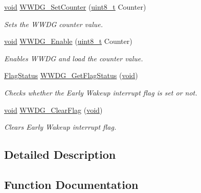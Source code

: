 \begin{DoxyCompactItemize}
\hyperlink{usb__devapi_8h_afabf60e7f57651d6d595a02c75f07cd0}{void} \hyperlink{group___w_w_d_g___private___functions_ga6e44cc35f133b28b9ad861f459bf8d76}{W\+W\+D\+G\+\_\+\+Set\+Counter} (\hyperlink{_p_e___types_8h_aba7bc1797add20fe3efdf37ced1182c5}{uint8\+\_\+t} Counter)
\begin{DoxyCompactList}\small\item\em Sets the W\+W\+DG counter value. \end{DoxyCompactList}\item 
\hyperlink{usb__devapi_8h_afabf60e7f57651d6d595a02c75f07cd0}{void} \hyperlink{group___w_w_d_g___private___functions_ga10dc2554d0b504b5472e3ecf0f02a9e6}{W\+W\+D\+G\+\_\+\+Enable} (\hyperlink{_p_e___types_8h_aba7bc1797add20fe3efdf37ced1182c5}{uint8\+\_\+t} Counter)
\begin{DoxyCompactList}\small\item\em Enables W\+W\+DG and load the counter value. \end{DoxyCompactList}\item 
\hyperlink{agilefox_2library_2inc_2stm32f10x__type_8h_a89136caac2e14c55151f527ac02daaff}{Flag\+Status} \hyperlink{group___w_w_d_g___private___functions_ga7df4882d45918b9b8249dfca1e44fabc}{W\+W\+D\+G\+\_\+\+Get\+Flag\+Status} (\hyperlink{usb__devapi_8h_afabf60e7f57651d6d595a02c75f07cd0}{void})
\begin{DoxyCompactList}\small\item\em Checks whether the Early Wakeup interrupt flag is set or not. \end{DoxyCompactList}\item 
\hyperlink{usb__devapi_8h_afabf60e7f57651d6d595a02c75f07cd0}{void} \hyperlink{group___w_w_d_g___private___functions_gabd2b5a6317c2e1a3ab0795838ce59dd2}{W\+W\+D\+G\+\_\+\+Clear\+Flag} (\hyperlink{usb__devapi_8h_afabf60e7f57651d6d595a02c75f07cd0}{void})
\begin{DoxyCompactList}\small\item\em Clears Early Wakeup interrupt flag. \end{DoxyCompactList}\end{DoxyCompactItemize}


\subsection{Detailed Description}


\subsection{Function Documentation}
